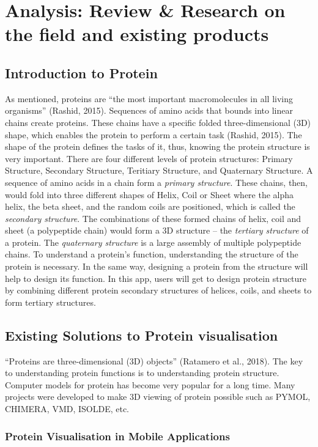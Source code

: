 \chapter{Analysis: Review \& Research on the field and existing products}
\label{ch:litRev}

\section{Introduction to Protein}

As mentioned, proteins are “the most important macromolecules in all living organisms” (Rashid, 2015). Sequences of amino acids that bounds into linear chains create proteins. These chains have a specific folded three-dimensional (3D) shape, which enables the protein to perform a certain task (Rashid, 2015). The shape of the protein defines the tasks of it, thus, knowing the protein structure is very important. There are four different levels of protein structures: Primary Structure, Secondary Structure, Teritiary Structure, and Quaternary Structure. A sequence of amino acids in a chain form a \emph{primary structure}. These chains, then, would fold into three different shapes of Helix, Coil or Sheet where the alpha helix, the beta sheet, and the random coils are positioned, which is called the \emph{secondary structure}. The combinations of these formed chains of helix, coil and sheet (a polypeptide chain) would form a 3D structure – the \emph{tertiary structure} of a protein. The \emph{quaternary structure} is a large assembly of multiple polypeptide chains.
To understand a protein’s function, understanding the structure of the protein is necessary. In the same way, designing a protein from the structure will help to design its function. 
In this app, users will get to design protein structure by combining different protein secondary structures of helices, coils, and sheets to form tertiary structures. 


\section{Existing Solutions to Protein visualisation}
 “Proteins are three-dimensional (3D) objects” (Ratamero et al., 2018). The key to understanding protein functions is to understanding protein structure. Computer models for protein has become very popular for a long time. Many projects were developed to make 3D viewing of protein possible such as PYMOL, CHIMERA, VMD, ISOLDE, etc. 
 
 \subsection{Protein Visualisation in Mobile Applications}

